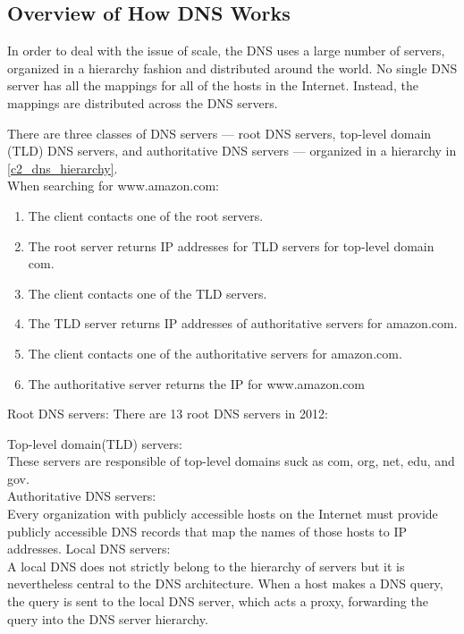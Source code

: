 \subsection{Overview of How DNS Works}

In order to deal with the issue of scale, the DNS uses a large number of servers,
organized in a hierarchy fashion and distributed around the world. No single DNS
server has all the mappings for all of the hosts in the Internet. Instead, the mappings
are distributed across the DNS servers.\\


There are three classes of DNS servers — root DNS servers, top-level domain (TLD) DNS
servers, and authoritative DNS servers — organized in a hierarchy in \autoref{c2_dns_hierarchy}.\\

When searching for www.amazon.com:
\begin{enumerate}
    \item The client contacts one of the root servers.
    \item The root server returns IP addresses for TLD servers for top-level domain com.
    \item The client contacts one of the TLD servers.
    \item The TLD server returns  IP addresses of authoritative servers for amazon.com.
    \item The client contacts one of the authoritative servers for amazon.com.
    \item The authoritative server returns the IP for www.amazon.com
\end{enumerate}


Root DNS servers: There are 13 root DNS servers in 2012:

Top-level domain(TLD) servers:\\
These servers are responsible of top-level domains suck as com, org, net,
edu, and gov.\\
\newline
Authoritative DNS servers:\\
Every organization with publicly accessible hosts on the Internet must provide
publicly accessible DNS records that map the names of those hosts to IP addresses.
\newline
Local DNS servers:\\
A local DNS does not strictly belong to the hierarchy of servers but it is nevertheless
central to the DNS architecture. When a host makes a DNS query, the query is
sent to the local DNS server, which acts a proxy, forwarding the query into the DNS
server hierarchy.


